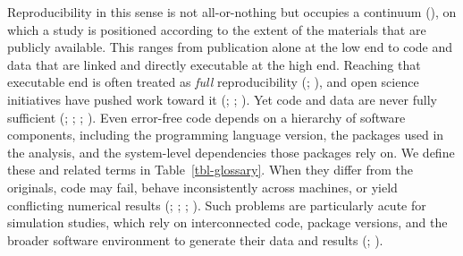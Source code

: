 \documentclass[
  man,
  longtable,
  nolmodern,
  notxfonts,
  notimes,
  colorlinks=true,linkcolor=blue,citecolor=blue,urlcolor=blue]{apa7}
\begin{document}
Reproducibility in this sense is not all-or-nothing but occupies a
continuum (), on which a study is
positioned according to the extent of the materials that are publicly
available. This ranges from publication alone at the low end to code and
data that are linked and directly executable at the high end. Reaching
that executable end is often treated as \emph{full} reproducibility
(;
),
and open science initiatives have pushed work toward it
(;
;
). Yet code and data
are never fully sufficient (; ;
;
). Even
error-free code depends on a hierarchy of software components, including
the programming language version, the packages used in the analysis, and
the system-level dependencies those packages rely on. We define these
and related terms in Table~\ref{tbl-glossary}. When they differ from the
originals, code may fail, behave inconsistently across machines, or
yield conflicting numerical results
(;
;
;
). Such problems are
particularly acute for simulation studies, which rely on interconnected
code, package versions, and the broader software environment to generate
their data and results (; ).
\end{document}
